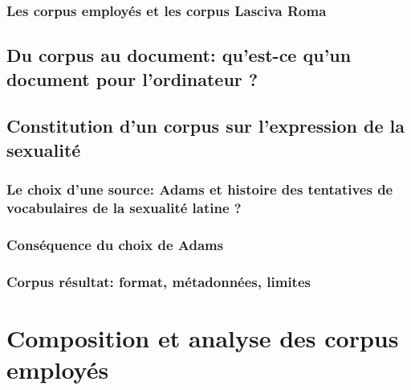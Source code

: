 
\subsubsection{Les corpus employés et les corpus Lasciva Roma}


\subsection{Du corpus au document: qu’est-ce qu’un document pour l’ordinateur ?}


\subsection{Constitution d’un corpus sur l’expression de la sexualité}

\subsubsection{Le choix d’une source: Adams et histoire des tentatives de vocabulaires de la sexualité latine ?}


\subsubsection{Conséquence du choix de Adams}



\subsubsection{Corpus résultat: format, métadonnées, limites}



\section{Composition et analyse des corpus employés}

